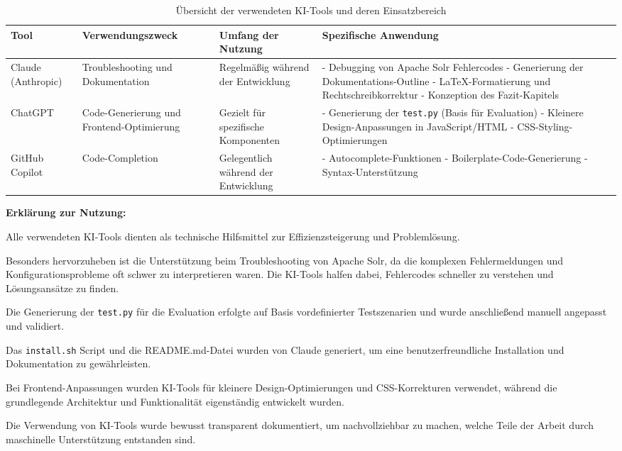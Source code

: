 \begin{table}[h!]
\centering
\begin{tabular}{|p{3cm}|p{3cm}|p{4cm}|p{4cm}|}
\hline
\textbf{Tool} & \textbf{Verwendungszweck} & \textbf{Umfang der Nutzung} & \textbf{Spezifische Anwendung} \\
\hline
Claude (Anthropic) & Troubleshooting und Dokumentation & Regelmäßig während der Entwicklung & 
- Debugging von Apache Solr Fehlercodes
- Generierung der Dokumentations-Outline
- LaTeX-Formatierung und Rechtschreibkorrektur
- Konzeption des Fazit-Kapitels \\
\hline
ChatGPT & Code-Generierung und Frontend-Optimierung & Gezielt für spezifische Komponenten &
- Generierung der \texttt{test.py} (Basis für Evaluation)
- Kleinere Design-Anpassungen in JavaScript/HTML
- CSS-Styling-Optimierungen \\
\hline
GitHub Copilot & Code-Completion & Gelegentlich während der Entwicklung &
- Autocomplete-Funktionen
- Boilerplate-Code-Generierung
- Syntax-Unterstützung \\
\hline
\end{tabular}
\caption{Übersicht der verwendeten KI-Tools und deren Einsatzbereich}
\label{tab:ai_tools}
\end{table}

\textbf{Erklärung zur Nutzung:}

Alle verwendeten KI-Tools dienten als technische Hilfsmittel zur Effizienzsteigerung und Problemlösung.

Besonders hervorzuheben ist die Unterstützung beim Troubleshooting von Apache Solr, da die komplexen Fehlermeldungen und Konfigurationsprobleme oft schwer zu interpretieren waren. Die KI-Tools halfen dabei, Fehlercodes schneller zu verstehen und Lösungsansätze zu finden.

Die Generierung der \texttt{test.py} für die Evaluation erfolgte auf Basis vordefinierter Testszenarien und wurde anschließend manuell angepasst und validiert. 

Das \texttt{install.sh} Script und die README.md-Datei wurden von Claude generiert, um eine benutzerfreundliche Installation und Dokumentation zu gewährleisten.

Bei Frontend-Anpassungen wurden KI-Tools für kleinere Design-Optimierungen und CSS-Korrekturen verwendet, während die grundlegende Architektur und Funktionalität eigenständig entwickelt wurden.

Die Verwendung von KI-Tools wurde bewusst transparent dokumentiert, um nachvollziehbar zu machen, welche Teile der Arbeit durch maschinelle Unterstützung entstanden sind.
